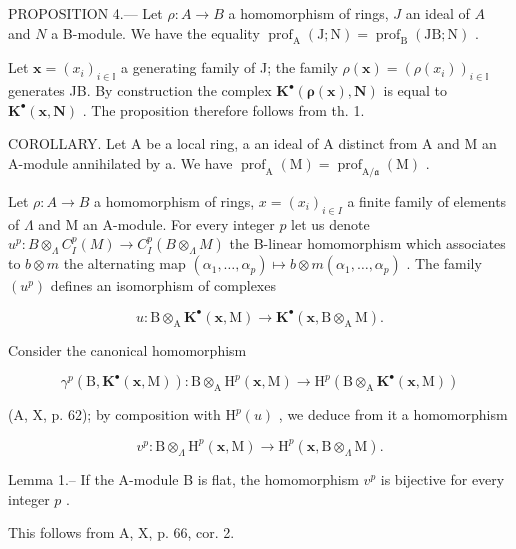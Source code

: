 PROPOSITION 4.--- Let \(\rho: A \to B\) a homomorphism of rings, \(J\) an ideal of \(A\) and \(N\) a B-module. We have the equality \(\operatorname{prof}_{\mathrm{A}}(\mathrm{J}; \mathrm{N}) = \operatorname{prof}_{\mathrm{B}}(\mathrm{JB}; \mathrm{N})\) .

Let \(\mathbf{x} = (x_{i})_{i \in \mathbb{I}}\) a generating family of J; the family \(\rho(\mathbf{x}) = (\rho(x_{i}))_{i \in \mathbb{I}}\) generates JB. By construction the complex \(\mathbf{K}^{\bullet}(\boldsymbol{\rho}(\mathbf{x}), \mathbf{N})\) is equal to \(\mathbf{K}^{\bullet}(\mathbf{x}, \mathbf{N})\) . The proposition therefore follows from th. 1.

COROLLARY. Let A be a local ring, a an ideal of A distinct from A and M an A-module annihilated by a. We have \(\operatorname{prof}_{\mathrm{A}}(\mathrm{M}) = \operatorname{prof}_{\mathrm{A}/\mathfrak{a}}(\mathrm{M})\) .

Let \(\rho: A \to B\) a homomorphism of rings, \(x = (x_i)_{i \in I}\) a finite family of elements of \(\Lambda\) and M an A-module. For every integer \(p\) let us denote \(u^p: B \otimes_\Lambda C_I^p(M) \longrightarrow C_I^p(B \otimes_\Lambda M)\) the B-linear homomorphism which associates to \(b \otimes m\) the alternating map \((\alpha_1, \ldots, \alpha_p) \mapsto b \otimes m(\alpha_1, \ldots, \alpha_p)\) . The family \((u^p)\) defines an isomorphism of complexes

\[
u: \mathrm{B} \otimes_ {\mathrm{A}} \mathbf {K} ^ {\bullet} (\mathbf {x}, \mathrm{M}) \longrightarrow \mathbf {K} ^ {\bullet} (\mathbf {x}, \mathrm{B} \otimes_ {\mathrm{A}} \mathrm{M}).
\]

Consider the canonical homomorphism

\[
\gamma^ {p} (\mathrm{B}, \mathbf {K} ^ {\bullet} (\mathbf {x}, \mathrm{M})): \mathrm{B} \otimes_ {\mathrm{A}} \mathrm{H} ^ {p} (\mathbf {x}, \mathrm{M}) \longrightarrow \mathrm{H} ^ {p} (\mathrm{B} \otimes_ {\mathrm{A}} \mathbf {K} ^ {\bullet} (\mathbf {x}, \mathrm{M}))
\]

(A, X, p. 62); by composition with \(\mathrm{H}^{p}(u)\) , we deduce from it a homomorphism

\[
v ^ {p}: \mathrm{B} \otimes_ {\Lambda} \mathrm{H} ^ {p} (\mathbf {x}, \mathrm{M}) \longrightarrow \mathrm{H} ^ {p} (\mathbf {x}, \mathrm{B} \otimes_ {\Lambda} \mathrm{M}).
\]

Lemma 1.-- If the A-module B is flat, the homomorphism \(v^p\) is bijective for every integer \(p\) .

This follows from A, X, p. 66, cor. 2.

